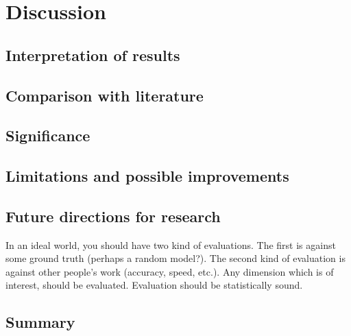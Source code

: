 \chapter{Discussion}
\label{ch:discussion}

\section{Interpretation of results}

\section{Comparison with literature}

\section{Significance}

\section{Limitations and possible improvements}

\section{Future directions for research}

In an ideal world, you should have two kind of evaluations. The first is against some ground truth (perhaps a random model?). The second kind of evaluation is against other people's work (accuracy, speed, etc.). Any dimension which is of interest, should be evaluated.  Evaluation should be statistically sound.

\Blindtext

\section*{Summary}
\blindtext